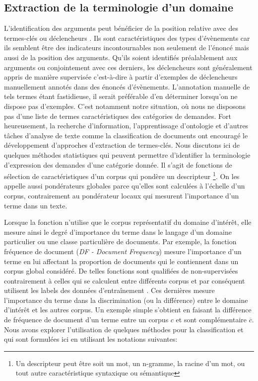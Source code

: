 \subsection{Extraction de la terminologie d'un domaine}
L'identification des arguments peut bénéficier de la position relative avec des termes-clés ou \og déclencheurs \fg{}. Ils sont caractéristiques des types d'évènements car ils semblent être des indicateurs incontournables non seulement de l'énoncé mais aussi de la position des arguments. Qu'ils soient identifiés préalablement aux arguments ou conjointement avec ces derniers, les déclencheurs sont généralement appris de manière supervisée c'est-à-dire à partir d'exemples  de déclencheurs manuellement annotés dans des énoncés d'évènements. L'annotation manuelle de tels termes étant fastidieuse, il serait préférable d'en déterminer lorsqu'on ne dispose pas d'exemples. C'est notamment notre situation, où nous ne disposons pas d'une liste de termes caractéristiques des catégories de demandes. Fort heureusement, la recherche d'information, l'apprentissage d'ontologie et d'autres tâches d'analyse de texte comme la classification de documents ont encouragé le développement d'approches d'extraction de termes-clés. Nous discutons ici de quelques méthodes statistiques qui peuvent permettre d'identifier la terminologie d'expression des demandes d'une catégorie donnée. Il s'agit de fonctions de sélection de caractéristiques d'un corpus qui pondère un descripteur \footnote{Un descripteur peut être soit un mot, un n-gramme, la racine d'un mot, ou tout autre caractéristique syntaxique ou sémantique}. On les appelle aussi pondérateurs globales parce qu'elles sont calculées à l'échelle d'un corpus, contrairement au pondérateur locaux qui mesurent l'importance d'un terme dans un texte.

 Lorsque la fonction n'utilise que le corpus représentatif du domaine d'intérêt, elle mesure ainsi le degré d'importance du terme dans le langage d'un domaine particulier ou une classe particulière de documents. Par exemple, la fonction \og fréquence de document \fg{} (\textit{DF - Document Frequency}) mesure l'importance d'un terme en lui affectant la proportion de documents qui le contiennent dans un corpus global considéré. De telles fonctions sont qualifiées de non-supervisées contrairement à celles qui se calculent entre différents corpus  et par conséquent utilisent les labels des données d'entraînement \citep{lan2009termweighting, wu2017balancingtermweight}. Ces dernières mesure l'importance du terme dans la discrimination (ou la différence) entre le domaine d'intérêt et les autres corpus. Un exemple simple s'obtient en faisant la différence de \og fréquence de document \fg{} d'un terme entre un corpus $c$ et sont complémentaire $\overline{c}$. Nous avons explorer l'utilisation de quelques méthodes pour la classification et qui sont formulées ici en utilisant les notations suivantes:

